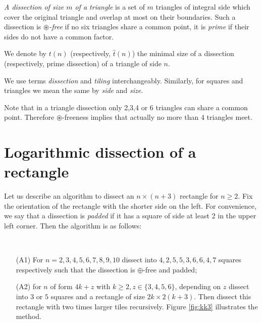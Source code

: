\begin{defn}
\label{defn:triangle-dissection}
\emph{A dissection of size $m$ of a triangle} is a set of $m$ triangles of integral side which cover the original triangle and overlap at most on their boundaries. Such a dissection is \emph{$\circledast$-free} if no six triangles share a common point, it is \emph{prime} if their sides do not have a common factor.

We denote by $t(n)$ (respectively, $\hat t(n)$) the minimal size of a dissection (respectively, prime dissection) of a triangle of side $n$.
\end{defn}

We use terms \emph{dissection} and \emph{tiling} interchangeably. Similarly, for squares and triangles we mean the same by \emph{side} and \emph{size}.

Note that in a triangle dissection only 2,3,4 or 6 triangles can share a common point. Therefore $\circledast$-freeness implies that actually no more than 4 triangles meet.


\section{Logarithmic dissection of a rectangle}
\label{sec:log-rectangle}

Let us describe an algorithm to dissect an $n \times (n+3)$ rectangle for $n \geq 2$. Fix the orientation of the rectangle with the shorter side on the left. For convenience, we say that a dissection is \emph{padded} if it has a square of side at least 2 in the upper left corner. Then the algorithm is as follows:

\begin{alg} \ 
\begin{enumerate}
		\item[(A1)] For $n=2,3,4,5,6,7,8,9,10$ dissect into $4,2,5,5,3,6,6,4,7$ squares respectively such that the dissection is $\oplus$-free and padded;
		\item[(A2)] for $n$ of form $4k+z$ with $k \geq 2, z \in \{3,4,5,6\}$, depending on $z$ dissect into $3$ or $5$ squares and a rectangle of size $2k \times 2(k+3)$. Then dissect this rectangle with two times larger tiles recursively. Figure \ref{fig:kk3} illustrates the method.
	\end{enumerate}
\end{alg}%
	

